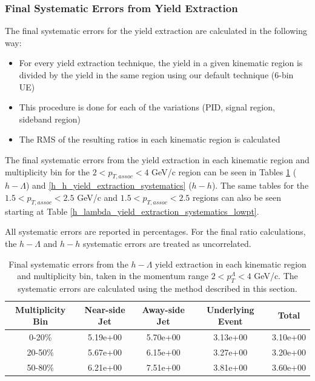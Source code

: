 \documentclass[ALICE,manyauthors]{ALICE_analysis_notes}
\begin{document}
\clearpage


\subsubsection{Final Systematic Errors from Yield Extraction}
\label{final_systematic_errors_yield_extraction}
The final systematic errors for the yield extraction are calculated in the following way:

\begin{itemize}
\item For every yield extraction technique, the yield in a given kinematic region is divided by the yield in the same region using our default technique (6-bin UE)
\item This procedure is done for each of the variations (PID, signal region, sideband region)
\item The RMS of the resulting ratios in each kinematic region is calculated
\end{itemize}

The final systematic errors from the yield extraction in each kinematic region and multiplicity bin for the  $2 < p_{T, assoc} < 4$ GeV/c region can be seen in Tables \ref{h_lambda_yield_extraction_systematics} ($h-\Lambda$) and \ref{h_h_yield_extraction_systematics} ($h-h$). The same tables for the  $1.5 < p_{T, assoc} < 2.5$ GeV/c and  $1.5 < p_{T, assoc} < 2.5$ regions can also be seen starting at Table \ref{h_lambda_yield_extraction_systematics_lowpt}. 

All systematic errors are reported in percentages. For the final ratio calculations, the $h-\Lambda$ and $h-h$ systematic errors are treated as uncorrelated.

\begin{table}[h!]
\centering
\begin{tabular}{| c | c | c | c | c | }
\hline
Multiplicity Bin & Near-side Jet & Away-side Jet & Underlying Event & Total  \\
\hline

0-20\% & 5.19e+00 & 5.70e+00  & 3.13e+00 & 3.10e+00 \\
20-50\% & 5.67e+00 & 6.15e+00  & 3.27e+00 & 3.20e+00 \\
50-80\% & 6.21e+00 & 7.51e+00  & 3.81e+00 & 3.60e+00 \\

\hline
\end{tabular}
\caption{Final systematic errors from the $h-\Lambda$ yield extraction in each kinematic region and multiplicity bin, taken in the momentum range $2 < p_{T}^{\Lambda} < 4$ GeV/c. The systematic errors are calculated using the method described in this section.}
\label{h_lambda_yield_extraction_systematics}
\end{table}
\end{document}
